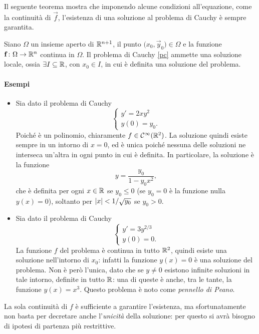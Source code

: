 Il seguente teorema mostra che imponendo alcune condizioni all'equazione, come la continuità di $\vec f$, l'esistenza di una soluzione al problema di Cauchy è sempre garantita.
\begin{teorema}[di Peano]
Siano $\Omega$ un insieme aperto di $\mathbb{R}^{n+1}$, il punto $\big(x_0,\vec y_0)\in\Omega$ e la funzione $\mathbf{f}\colon\Omega\to\mathbb{R}^n$ continua in $\Omega$. Il problema di Cauchy \eqref{pc} ammette una soluzione locale, ossia $\exists I\subseteq\mathbb{R}$, con $x_0\in I$, in cui è definita una soluzione del problema.
\end{teorema}
\paragraph{Esempi}
\begin{itemize}
\item Sia dato il problema di Cauchy
\[\begin{cases}y'=2xy^2\\y(0)=y_0.\end{cases}\]
Poiché è un polinomio, chiaramente $f\in\mathcal{C}^{{\infty}}(\mathbb{R}^2)$. La soluzione quindi esiste sempre in un intorno di $x=0$, ed è unica poiché nessuna delle soluzioni ne interseca un'altra in ogni punto in cui è definita. In particolare, la soluzione è la funzione
\[
y=\frac{y_0}{1-y_0x^2},
\]
che è definita per ogni $x\in\mathbb{R}$ se $y_0\leq 0$ (se $y_0=0$ è la funzione nulla $y(x)=0$), soltanto per $\left|{x}\right|<1/\sqrt{y_0}$ se $y_0>0$.
\item Sia dato il problema di Cauchy
\[\begin{cases}y'=3y^{2/3}\\y(0)=0.\end{cases}\]
La funzione $f$ del problema è continua in tutto $\mathbb{R}^2$, quindi esiste una soluzione nell'intorno di $x_0$: infatti la funzione $y(x)=0$ è una soluzione del problema. Non è però l'unica, dato che se $y\neq 0$ esistono infinite soluzioni in tale intorno, definite in tutto $\mathbb{R}$: una di queste è anche, tra le tante, la funzione $y(x)=x^3$. Questo problema è noto come \emph{pennello di Peano}.
\end{itemize}
La sola continuità di $f$ è sufficiente a garantire l'esistenza, ma sfortunatamente non basta per decretare anche l'\emph{unicità} della soluzione: per questo si avrà bisogno di ipotesi di partenza più restrittive.

